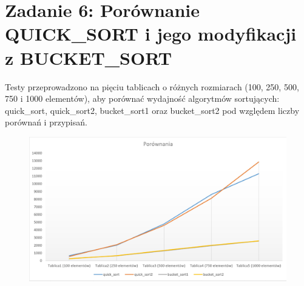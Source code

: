 \documentclass{article}
\theoremstyle{definition}
\begin{document}
	\section{Zadanie 6: Porównanie QUICK\_SORT i jego modyfikacji z BUCKET\_SORT}
	Testy przeprowadzono na pięciu tablicach o różnych rozmiarach (100, 250, 500, 750 i 1000 elementów), aby porównać wydajność algorytmów sortujących: quick\_sort, quick\_sort2, bucket\_sort1 oraz bucket\_sort2 pod względem liczby porównań i przypisań.
		\begin{table}[H]
			\centering
			\caption{Zestawienie ilości porównań dla quick\_sort i bucket\_sort oraz ich modyfikacji.}
		\end{table}
		\begin{figure}[H]	
			\centering
			\includegraphics[width=1.0\textwidth]{POR1.jpg} 
		\end{figure}
\end{document}
